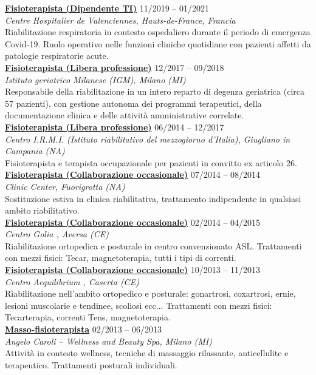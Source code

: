 \documentclass[a4paper]{article}
\newcommand{\voice}[5]{\href{#4}{\textbf{#1}} \hfill #2 \\ \textit{#3} \\ {\small #5} \vspace{0.2cm} \\}
\begin{document}
\begin{minipage}[t]{0.6\columnwidth}
    \voice{Fisioterapista (Dipendente TI)}
    {11/2019 -- 01/2021}
    {Centre Hospitalier de Valenciennes, Hauts-de-France, Francia}
    {https://www.ch-valenciennes.fr/}
    {
    Riabilitazione respiratoria in contesto ospedaliero durante il periodo di emergenza Covid-19. Ruolo operativo nelle funzioni cliniche quotidiane con pazienti affetti da patologie respiratorie acute.%
    }
    \voice{Fisioterapista (Libera professione)}
    {12/2017 -- 09/2018}
    {Istituto geriatrico Milanese (IGM), Milano (MI)}
    {https://www.igm-care.it/service/istituto-geriatrico-milanese/}
    {Responsabile della riabilitazione in un intero reparto di degenza geriatrica (circa 57 pazienti), con gestione autonoma dei programmi terapeutici, della documentazione clinica e delle attività amministrative correlate.}
    \voice{Fisioterapista (Libera professione)}
    {06/2014 -- 12/2017}
    {Centro I.R.M.I. (Istituto riabilitativo del mezzogiorno d'Italia), Giugliano in Campania (NA)}
    {https://www.aiopcampania.it/mostrascheda.asp?id=1425}
    {Fisioterapista e terapista occupazionale per pazienti in convitto ex articolo 26.}
    \voice{Fisioterapista (Collaborazione occasionale)}
    {07/2014 -- 08/2014}
    {Clinic Center, Fuorigrotta (NA)}
    {https://cliniccenter.eu/}
    {Sostituzione estiva in clinica riabilitativa, trattamento indipendente in qualsiasi ambito riabilitativo.
    }
    \voice{Fisioterapista (Collaborazione occasionale)}
    {02/2014 -- 04/2015}
    {Centro Golia , Aversa (CE)}
    {https://centrogolia.com/}
    {
        Riabilitazione ortopedica e posturale in centro convenzionato ASL.
        Trattamenti con mezzi fisici: Tecar, magnetoterapia, tutti i tipi di correnti.}
    \voice{Fisioterapista (Collaborazione occasionale)}
    {10/2013 -- 11/2013}
    {Centro Aequilibrium , Caserta (CE)}
    {https://www.fisioterapistacaserta.it/About}
    {Riabilitazione nell'ambito ortopedico e posturale:  gonartrosi, coxartrosi, ernie, lesioni muscolarie  e tendinee, scoliosi ecc...
    Trattamenti con mezzi fisici: Tecarterapia, correnti Tens, magnetoterapia.}
%
    \voice{Masso-fisioterapista}
    {02/2013 -- 06/2013}
    {Angelo Caroli – Wellness and Beauty Spa, Milano (MI)}
    {https://www.angelocaroli.com/}
    {
    Attività in contesto wellness, tecniche di massaggio rilassante, anticellulite e terapeutico.
    Trattamenti posturali individuali.
    }




















\end{minipage} 
\end{document}
